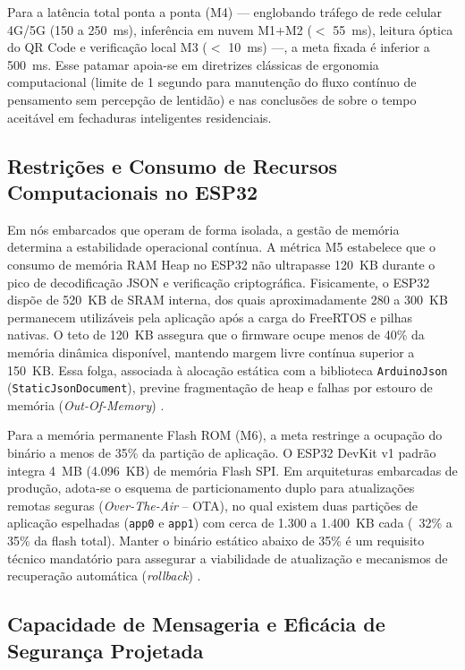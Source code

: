Para a latência total ponta a ponta (M4) --- englobando tráfego de rede celular 4G/5G (150 a 250~ms), inferência em nuvem M1+M2 ($<$ 55~ms), leitura óptica do QR Code e verificação local M3 ($<$ 10~ms) ---, a meta fixada é inferior a 500~ms. Esse patamar apoia-se em diretrizes clássicas de ergonomia computacional (limite de 1 segundo para manutenção do fluxo contínuo de pensamento sem percepção de lentidão) e nas conclusões de  sobre o tempo aceitável em fechaduras inteligentes residenciais.

\subsection{Restrições e Consumo de Recursos Computacionais no ESP32}
\label{subsec:res-consumo-recursos}

Em nós embarcados que operam de forma isolada, a gestão de memória determina a estabilidade operacional contínua. A métrica M5 estabelece que o consumo de memória RAM Heap no ESP32 não ultrapasse 120~KB durante o pico de decodificação JSON e verificação criptográfica. Fisicamente, o ESP32 dispõe de 520~KB de SRAM interna, dos quais aproximadamente 280 a 300~KB permanecem utilizáveis pela aplicação após a carga do FreeRTOS e pilhas nativas. O teto de 120~KB assegura que o firmware ocupe menos de 40\% da memória dinâmica disponível, mantendo margem livre contínua superior a 150~KB. Essa folga, associada à alocação estática com a biblioteca \texttt{ArduinoJson} (\texttt{StaticJsonDocument}), previne fragmentação de heap e falhas por estouro de memória (\textit{Out-Of-Memory}) \cite{vardakis2024}.

Para a memória permanente Flash ROM (M6), a meta restringe a ocupação do binário a menos de 35\% da partição de aplicação. O ESP32 DevKit v1 padrão integra 4~MB (4.096~KB) de memória Flash SPI. Em arquiteturas embarcadas de produção, adota-se o esquema de particionamento duplo para atualizações remotas seguras (\textit{Over-The-Air} -- OTA), no qual existem duas partições de aplicação espelhadas (\texttt{app0} e \texttt{app1}) com cerca de 1.300 a 1.400~KB cada (~32\% a 35\% da flash total). Manter o binário estático abaixo de 35\% é um requisito técnico mandatório para assegurar a viabilidade de atualização e mecanismos de recuperação automática (\textit{rollback}) \cite{simperf2024}.

\subsection{Capacidade de Mensageria e Eficácia de Segurança Projetada}
\label{subsec:res-vazao-seguranca}

